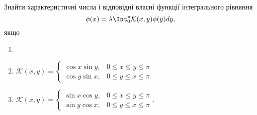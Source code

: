 \begin{problem}[5.37]
    Знайти характеристичні числа і відповідні власні функції інтегрального рівняння \[ \phi(x) = \lambda \Int_0^\pi \mathcal{K}(x,y)\phi(y) dy, \] якщо
    \begin{enumerate}
        \item
        \item $\mathcal{K}(x, y) = \begin{cases} \cos x \sin y, & 0 \le x \le y \le \pi \\ \cos y \sin x, & 0 \le y \le x \le \pi \end{cases}$
        \item $\mathcal{K}(x, y) = \begin{cases} \sin x \cos y, & 0 \le x \le y \le \pi \\ \sin y \cos x, & 0 \le y \le x \le \pi \end{cases}$.
    \end{enumerate}
\end{problem}

